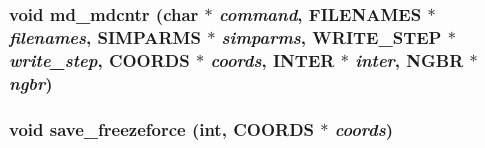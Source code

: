 \subsubsection{\setlength{\rightskip}{0pt plus 5cm}void md\_\-mdcntr (char $\ast$ {\em command}, {\bf FILENAMES} $\ast$ {\em filenames}, {\bf SIMPARMS} $\ast$ {\em simparms}, {\bf WRITE\_\-STEP} $\ast$ {\em write\_\-step}, {\bf COORDS} $\ast$ {\em coords}, {\bf INTER} $\ast$ {\em inter}, {\bf NGBR} $\ast$ {\em ngbr})}\label{md__mdcntr_8c_0324ea5c6e849493dd9353e726478357}


\subsubsection{\setlength{\rightskip}{0pt plus 5cm}void save\_\-freezeforce (int, {\bf COORDS} $\ast$ {\em coords})}\label{md__mdcntr_8c_f59b7317c9bc0195390e283c7093cbd2}


